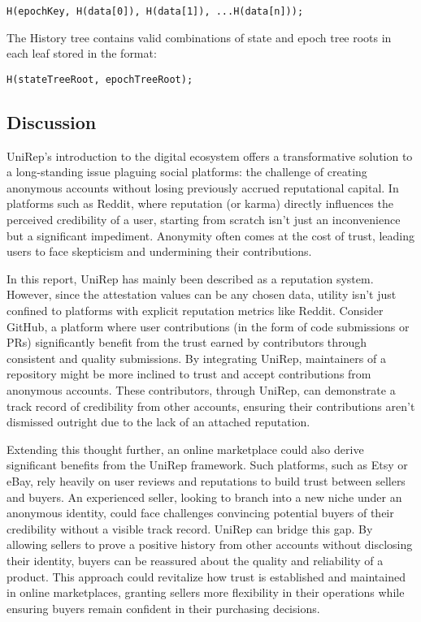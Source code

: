 \documentclass[11pt]{article}
\begin{document}
\begin{verbatim}
H(epochKey, H(data[0]), H(data[1]), ...H(data[n]));
\end{verbatim}

The History tree contains valid combinations of state and epoch tree roots in each leaf stored in the format:

\begin{verbatim}
H(stateTreeRoot, epochTreeRoot);
\end{verbatim}
\subsection{Discussion}
\label{sec:org0342ec7}

UniRep's introduction to the digital ecosystem offers a transformative solution to a long-standing issue plaguing social platforms: the challenge of creating anonymous accounts without losing previously accrued reputational capital. In platforms such as Reddit, where reputation (or karma) directly influences the perceived credibility of a user, starting from scratch isn't just an inconvenience but a significant impediment. Anonymity often comes at the cost of trust, leading users to face skepticism and undermining their contributions.

In this report, UniRep has mainly been described as a reputation system. However, since the attestation values can be any chosen data, utility isn't just confined to platforms with explicit reputation metrics like Reddit. Consider GitHub, a platform where user contributions (in the form of code submissions or PRs) significantly benefit from the trust earned by contributors through consistent and quality submissions. By integrating UniRep, maintainers of a repository might be more inclined to trust and accept contributions from anonymous accounts. These contributors, through UniRep, can demonstrate a track record of credibility from other accounts, ensuring their contributions aren't dismissed outright due to the lack of an attached reputation.

Extending this thought further, an online marketplace could also derive significant benefits from the UniRep framework. Such platforms, such as Etsy or eBay, rely heavily on user reviews and reputations to build trust between sellers and buyers. An experienced seller, looking to branch into a new niche under an anonymous identity, could face challenges convincing potential buyers of their credibility without a visible track record. UniRep can bridge this gap. By allowing sellers to prove a positive history from other accounts without disclosing their identity, buyers can be reassured about the quality and reliability of a product. This approach could revitalize how trust is established and maintained in online marketplaces, granting sellers more flexibility in their operations while ensuring buyers remain confident in their purchasing decisions.
\end{document}
